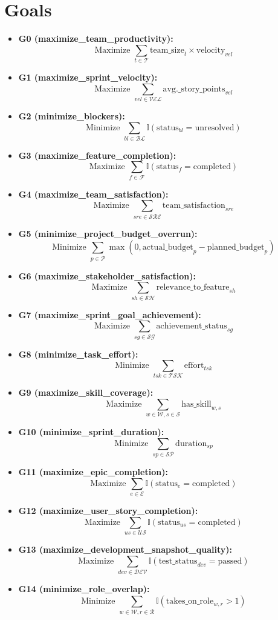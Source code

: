 \documentclass{article}
\begin{document}
\section{Goals}
\begin{itemize}
    \item \textbf{G0 (maximize\_team\_productivity):}
    \[
    \text{Maximize } \sum_{t \in \mathcal{T}} \text{team\_size}_t \times \text{velocity}_{vel}
    \]
    \item \textbf{G1 (maximize\_sprint\_velocity):}
    \[
    \text{Maximize } \sum_{vel \in \mathcal{VEL}} \text{avg.\_story\_points}_{vel}
    \]
    \item \textbf{G2 (minimize\_blockers):}
    \[
    \text{Minimize } \sum_{bl \in \mathcal{BL}} \mathbb{I}(\text{status}_{bl} = \text{unresolved})
    \]
    \item \textbf{G3 (maximize\_feature\_completion):}
    \[
    \text{Maximize } \sum_{f \in \mathcal{F}} \mathbb{I}(\text{status}_f = \text{completed})
    \]
    \item \textbf{G4 (maximize\_team\_satisfaction):}
    \[
    \text{Maximize } \sum_{sre \in \mathcal{SRE}} \text{team\_satisfaction}_{sre}
    \]
    \item \textbf{G5 (minimize\_project\_budget\_overrun):}
    \[
    \text{Minimize } \sum_{p \in \mathcal{P}} \max(0, \text{actual\_budget}_p - \text{planned\_budget}_p)
    \]
    \item \textbf{G6 (maximize\_stakeholder\_satisfaction):}
    \[
    \text{Maximize } \sum_{sh \in \mathcal{SH}} \text{relevance\_to\_feature}_{sh}
    \]
    \item \textbf{G7 (maximize\_sprint\_goal\_achievement):}
    \[
    \text{Maximize } \sum_{sg \in \mathcal{SG}} \text{achievement\_status}_{sg}
    \]
    \item \textbf{G8 (minimize\_task\_effort):}
    \[
    \text{Minimize } \sum_{tsk \in \mathcal{TSK}} \text{effort}_{tsk}
    \]
    \item \textbf{G9 (maximize\_skill\_coverage):}
    \[
    \text{Maximize } \sum_{w \in \mathcal{W}, s \in \mathcal{S}} \text{has\_skill}_{w,s}
    \]
    \item \textbf{G10 (minimize\_sprint\_duration):}
    \[
    \text{Minimize } \sum_{sp \in \mathcal{SP}} \text{duration}_{sp}
    \]
    \item \textbf{G11 (maximize\_epic\_completion):}
    \[
    \text{Maximize } \sum_{e \in \mathcal{E}} \mathbb{I}(\text{status}_e = \text{completed})
    \]
    \item \textbf{G12 (maximize\_user\_story\_completion):}
    \[
    \text{Maximize } \sum_{us \in \mathcal{US}} \mathbb{I}(\text{status}_{us} = \text{completed})
    \]
    \item \textbf{G13 (maximize\_development\_snapshot\_quality):}
    \[
    \text{Maximize } \sum_{dev \in \mathcal{DEV}} \mathbb{I}(\text{test\_status}_{dev} = \text{passed})
    \]
    \item \textbf{G14 (minimize\_role\_overlap):}
    \[
    \text{Minimize } \sum_{w \in \mathcal{W}, r \in \mathcal{R}} \mathbb{I}(\text{takes\_on\_role}_{w,r} > 1)
    \]
\end{itemize}
\end{document}
